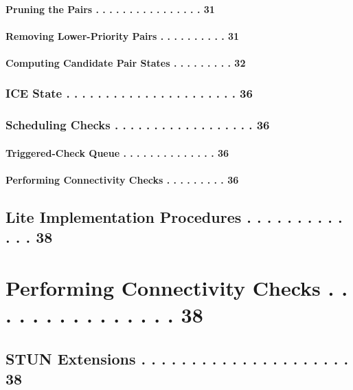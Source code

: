 \documentclass{article}
\begin{document}
\paragraph{Pruning the Pairs . . . . . . . . . . . . . . . .  31}

\paragraph{Removing Lower-Priority Pairs . . . . . . . . . .  31}

\paragraph{Computing Candidate Pair States . . . . . . . . .  32}

\subsubsection{ICE State . . . . . . . . . . . . . . . . . . . . . .  36}

\subsubsection{Scheduling Checks . . . . . . . . . . . . . . . . . .  36}

\paragraph{Triggered-Check Queue . . . . . . . . . . . . . .  36}

\paragraph{Performing Connectivity Checks  . . . . . . . . .  36}

\subsection{Lite Implementation Procedures  . . . . . . . . . . . . .  38}

\section{Performing Connectivity Checks  . . . . . . . . . . . . . . .  38}

\subsection{STUN Extensions . . . . . . . . . . . . . . . . . . . . .  38}
\end{document}
